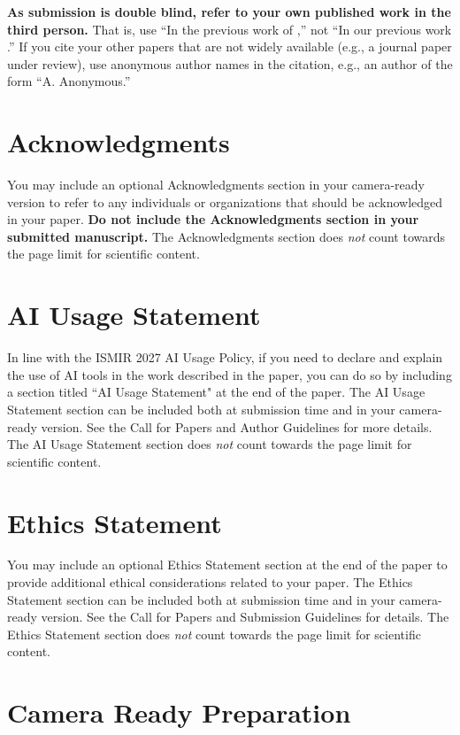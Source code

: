 \documentclass{article}
\begin{document}
\textbf{As submission is double blind, refer to your own published work in the third person.} That is, use ``In the previous work of \cite{ISMIR17Author:01},'' not ``In our previous work \cite{ISMIR17Author:01}.'' If you cite your other papers that are not widely available (e.g., a journal paper under review), use anonymous author names in the citation, e.g., an author of the form ``A. Anonymous.''

\section{Acknowledgments}

You may include an optional Acknowledgments section in your camera-ready version to refer to any individuals or organizations that should be acknowledged in your paper. \textbf{Do not include the Acknowledgments section in your submitted manuscript.} The Acknowledgments section does \textit{not} count towards the page limit for scientific content.

\section{AI Usage Statement}

In line with the ISMIR 2027 AI Usage Policy, if you need to declare and explain the use of AI tools in the work described in the paper, you can do so by including a section titled ``AI Usage Statement" at the end of the paper. The AI Usage Statement section can be included both at submission time and in your camera-ready version. See the Call for Papers and Author Guidelines for more details. The AI Usage Statement section does \textit{not} count towards the page limit for scientific content. 

\section{Ethics Statement}

You may include an optional Ethics Statement section at the end of the paper to provide additional ethical considerations related to your paper. The Ethics Statement section can be included both at submission time and in your camera-ready version. See the Call for Papers and Submission Guidelines for details. The Ethics Statement section does \textit{not} count towards the page limit for scientific content.

\section{Camera Ready Preparation}\label{sec:cameraready}
\end{document}
